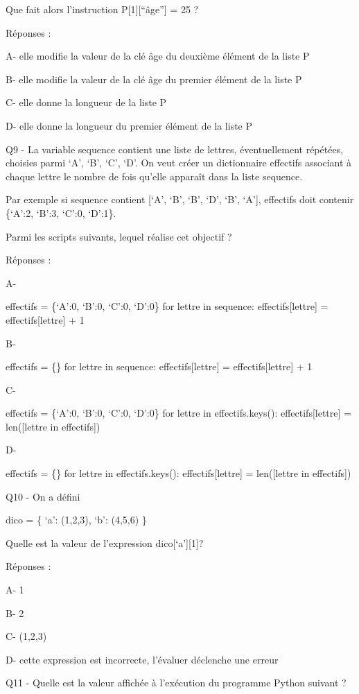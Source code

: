 \documentclass[
]{book}
\begin{document}
Que fait alors l'instruction P{[}1{]}{[}``âge''{]} = 25 ?

Réponses :

A- elle modifie la valeur de la clé âge du deuxième élément de la liste P

B- elle modifie la valeur de la clé âge du premier élément de la liste P

C- elle donne la longueur de la liste P

D- elle donne la longueur du premier élément de la liste P

Q9 - La variable sequence contient une liste de lettres, éventuellement répétées, choisies parmi `A', `B', `C', `D'. On veut créer un dictionnaire effectifs associant à chaque lettre le nombre de fois qu'elle apparaît dans la liste sequence.

Par exemple si sequence contient {[}`A', `B', `B', `D', `B', `A'{]}, effectifs doit contenir \{`A':2, `B':3, `C':0, `D':1\}.

Parmi les scripts suivants, lequel réalise cet objectif ?

Réponses :

A-

effectifs = \{`A':0, `B':0, `C':0, `D':0\}
for lettre in sequence:
effectifs{[}lettre{]} = effectifs{[}lettre{]} + 1

B-

effectifs = \{\}
for lettre in sequence:
effectifs{[}lettre{]} = effectifs{[}lettre{]} + 1

C-

effectifs = \{`A':0, `B':0, `C':0, `D':0\}
for lettre in effectifs.keys():
effectifs{[}lettre{]} = len({[}lettre in effectifs{]})

D-

effectifs = \{\}
for lettre in effectifs.keys():
effectifs{[}lettre{]} = len({[}lettre in effectifs{]})

Q10 - On a défini

dico = \{ `a': (1,2,3), `b': (4,5,6) \}

Quelle est la valeur de l'expression dico{[}`a'{]}{[}1{]}?

Réponses :

A- 1

B- 2

C- (1,2,3)

D- cette expression est incorrecte, l'évaluer déclenche une erreur

Q11 - Quelle est la valeur affichée à l'exécution du programme Python suivant ?
\end{document}
